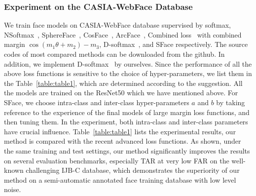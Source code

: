 \documentclass[journal,comsoc]{IEEEtran}
\begin{document}
\subsubsection{Experiment on the CASIA-WebFace Database}
We train face models on CASIA-WebFace database supervised by softmax, NSoftmax~\cite{wang2017normface}, SphereFace~\cite{Liu2017SphereFace}, CosFace~\cite{Wang2018CosFace}, ArcFace~\cite{deng2019arcface}, Combined loss~\cite{deng2019arcface} with combined margin $\cos \left( {{m_1}\theta  + {m_2}} \right) - {m_3}$, D-softmax~\cite{he2019softmax}, and SFace respectively. The source codes of most compared methods can be downloaded from the github. In addition, we implement D-softmax~\cite{he2019softmax} by ourselves. Since the performance of all the above loss functions is sensitive to the choice of hyper-parameters, we list them in the Table~\ref{table:table1}, which are determined according to the suggestion. All the models are trained on the ResNet50 which we have mentioned above. For SFace, we choose intra-class and inter-class hyper-parameters $a$ and $b$ by taking reference to the experience of the final models of large margin loss functions, and then tuning them. In the experiment, both intra-class and inter-class parameters have crucial influence. Table~\ref{table:table1} lists the experimental results, our method is compared with the recent advanced loss functions. As shown, under the same training and test settings, our method significantly improves the results on several evaluation benchmarks, especially TAR at very low FAR on the well-known challenging IJB-C database, which demonstrates the superiority of our method on a semi-automatic annotated face training database with low level noise. 
\end{document}
